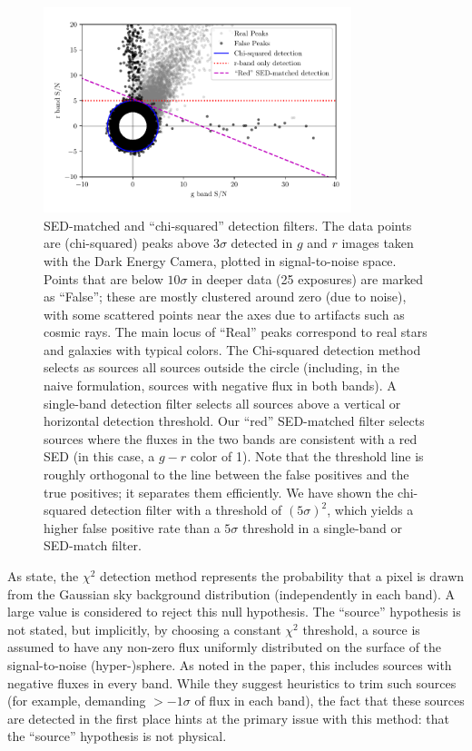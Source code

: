 \documentclass[letterpaper,preprint]{aastex62}
\begin{document}
\begin{figure}
  \begin{center}
    \includegraphics[width=0.8\textwidth]{sed-matched}
    \caption{SED-matched and ``chi-squared'' detection filters.  The
      data points are (chi-squared) peaks above $3 \sigma$ detected in
      $g$ and $r$ images taken with the Dark Energy Camera, plotted in
      signal-to-noise space.  Points that are below $10 \sigma$ in
      deeper data (25 exposures) are marked as ``False''; these are
      mostly clustered around zero (due to noise), with some scattered
      points near the axes due to artifacts such as cosmic rays. The
      main locus of ``Real'' peaks correspond to real stars and
      galaxies with typical colors.  The Chi-squared detection method
      selects as sources all sources outside the circle (including, in
      the naive formulation, sources with negative flux in both
      bands).  A single-band detection filter selects all sources
      above a vertical or horizontal detection threshold.  Our ``red''
      SED-matched filter selects sources where the fluxes in the two
      bands are consistent with a red SED (in this case, a $g - r$
      color of 1).  Note that the threshold line is roughly orthogonal
      to the line between the false positives and the true positives;
      it separates them efficiently.  We have shown the chi-squared
      detection filter with a threshold of $(5\sigma)^2$, which yields
      a higher false positive rate than a $5\sigma$ threshold in a
      single-band or SED-match filter.
      \label{fig:sedmatched}
    }
  \end{center}
\end{figure}

As \cite{szalay1999} state, the $\chi^2$ detection method represents
the probability that a pixel is drawn from the Gaussian sky background
distribution (independently in each band).  A large value is
considered to reject this null hypothesis.  The ``source'' hypothesis
is not stated, but implicitly, by choosing a constant $\chi^2$
threshold, a source is assumed to have any non-zero flux uniformly
distributed on the surface of the signal-to-noise (hyper-)sphere.  As
noted in the paper, this includes sources with negative fluxes in
every band.  While they suggest heuristics to trim such sources (for
example, demanding $> -1 \sigma$ of flux in each band), the fact that
these sources are detected in the first place hints at the primary
issue with this method: that the ``source'' hypothesis is not
physical.
\end{document}
